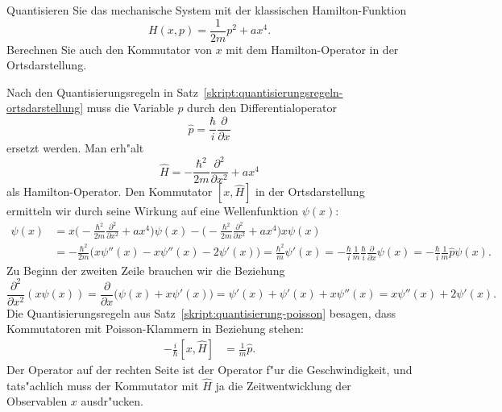 Quantisieren Sie das mechanische System mit der klassischen Hamilton-Funktion
\[
H(x,p)=\frac{1}{2m}p^2+ax^4.
\]
Berechnen Sie auch den Kommutator von $x$ mit dem Hamilton-Operator in
der Ortsdarstellung.

\begin{loesung}
Nach den Quantisierungsregeln in
Satz~\ref{skript:quantisierungsregeln-ortsdarstellung}
muss die Variable $p$ durch den Differentialoperator
\[
\hat p=\frac{\hbar}{i}\frac{\partial}{\partial x}
\]
ersetzt werden.
Man erh"alt
\[
\hat H
=
-\frac{\hbar^2}{2m}\frac{\partial^2}{\partial x^2}+ax^4
\]
als Hamilton-Operator.
Den Kommutator $[x,\hat H]$ in der Ortsdarstellung ermitteln wir durch 
seine Wirkung auf eine Wellenfunktion $\psi(x)$:
\begin{align*}
[x,\hat H]\psi(x)
&=
x\biggl(
-\frac{\hbar^2}{2m}\frac{\partial^2}{\partial x^2}+ax^4
\biggr)\psi(x)
-
\biggl(
-\frac{\hbar^2}{2m}\frac{\partial^2}{\partial x^2}+ax^4
\biggr)x\psi(x)
\\
&=
-\frac{\hbar^2}{2m}\biggl(
x\psi''(x)
-
x\psi''(x)
-
2\psi'(x)
\biggr)
=
\frac{\hbar^2}{m}\psi'(x)
=
-\frac{\hbar}{i}\frac1{m}\frac{\hbar}{i}\frac{\partial}{\partial x}\psi(x)
=
-\frac{\hbar}{i}\frac1{m}\hat p\psi(x).
\end{align*}
Zu Beginn der zweiten Zeile brauchen wir die Beziehung
\[
\frac{\partial^2}{\partial x^2}(x\psi(x))
=
\frac{\partial}{\partial x}\biggl(
\psi(x)+x\psi'(x)
\biggr)
=
\psi'(x)+\psi'(x)+x\psi''(x)
=
x\psi''(x)+2\psi'(x).
\]
Die Quantisierungsregeln aus Satz~\ref{skript:quantisierung-poisson}
besagen, dass Kommutatoren mit Poisson-Klammern in Beziehung stehen:
\begin{align*}
-\frac{i}{\hbar}
[x,\hat H]
&=
\frac1{m}\hat p.
\end{align*}
Der Operator auf der rechten Seite ist der Operator f"ur die
Geschwindigkeit,
und tats"achlich muss der Kommutator mit $\hat H$ ja die Zeitwentwicklung
der Observablen $x$ ausdr"ucken.
\end{loesung}

